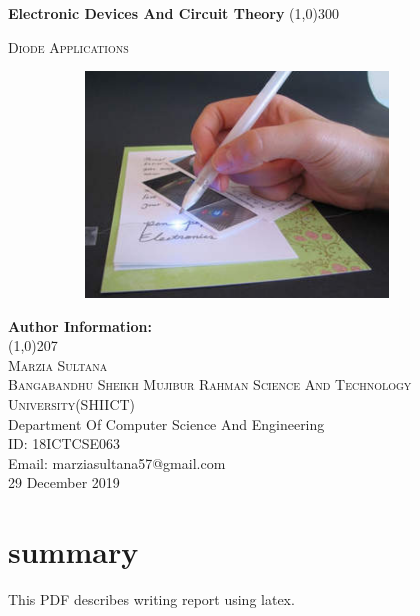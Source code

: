 \documentclass{article}
\begin{document}
	
	\begin{titlepage}
		\begin{center}
		\textbf{\huge \color{blue}Electronic Devices And Circuit Theory}
		\line(1,0){300}
		
		\textsc{\huge \color{gray} Diode Applications}\\
		\begin{figure}[h!]
			\centering
			\includegraphics[width=10cm ,height=6cm]{circuit read.png}
		\end{figure}
		
		\end{center}		
		\begin{flushright}
		\textbf{\huge \color{green} Author Information:}\\
		\color{green} \line(1,0){207}\\
			\textsc{\Large Marzia Sultana\\}
			\textsc{Bangabandhu Sheikh Mujibur Rahman Science And Technology University(SHIICT)}\\
			Department Of Computer Science And Engineering\\
			
			ID: 18ICTCSE063\\
			Email: marziasultana57@gmail.com\\
			29 December 2019
		\end{flushright}
		
	\end{titlepage}
	\tableofcontents
	\thispagestyle{empty}

	\section*{summary}
	This PDF describes writing report using latex.
	\cleardoublepage
	
	
	\newpage
\end{document}
